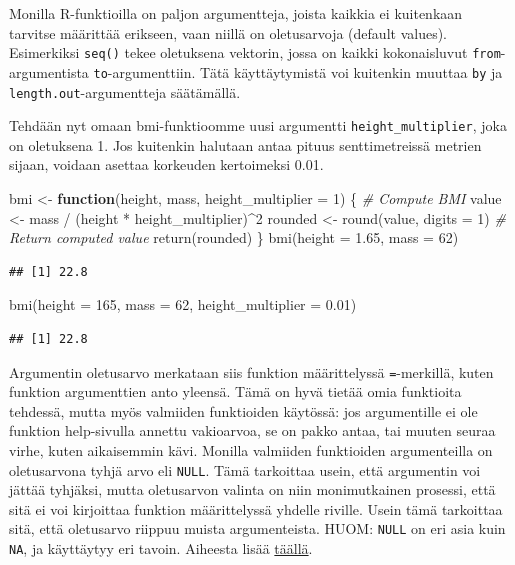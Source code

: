 \documentclass[
]{book}
\newenvironment{Shaded}{\begin{snugshade}}{\end{snugshade}}
\newcommand{\AttributeTok}[1]{\textcolor[rgb]{0.77,0.63,0.00}{#1}}
\newcommand{\CommentTok}[1]{\textcolor[rgb]{0.56,0.35,0.01}{\textit{#1}}}
\newcommand{\ControlFlowTok}[1]{\textcolor[rgb]{0.13,0.29,0.53}{\textbf{#1}}}
\newcommand{\DecValTok}[1]{\textcolor[rgb]{0.00,0.00,0.81}{#1}}
\newcommand{\FloatTok}[1]{\textcolor[rgb]{0.00,0.00,0.81}{#1}}
\newcommand{\FunctionTok}[1]{\textcolor[rgb]{0.00,0.00,0.00}{#1}}
\newcommand{\NormalTok}[1]{#1}
\newcommand{\OtherTok}[1]{\textcolor[rgb]{0.56,0.35,0.01}{#1}}
\newcommand{\SpecialCharTok}[1]{\textcolor[rgb]{0.00,0.00,0.00}{#1}}
\begin{document}
Monilla R-funktioilla on paljon argumentteja, joista kaikkia ei kuitenkaan tarvitse määrittää erikseen, vaan niillä on oletusarvoja (default values). Esimerkiksi \texttt{seq()} tekee oletuksena vektorin, jossa on kaikki kokonaisluvut \texttt{from}-argumentista \texttt{to}-argumenttiin. Tätä käyttäytymistä voi kuitenkin muuttaa \texttt{by} ja \texttt{length.out}-argumentteja säätämällä.

Tehdään nyt omaan bmi-funktioomme uusi argumentti \texttt{height\_multiplier}, joka on oletuksena 1. Jos kuitenkin halutaan antaa pituus senttimetreissä metrien sijaan, voidaan asettaa korkeuden kertoimeksi 0.01.

\begin{Shaded}
\begin{Highlighting}[]
\NormalTok{bmi }\OtherTok{\textless{}{-}} \ControlFlowTok{function}\NormalTok{(height, mass, }\AttributeTok{height\_multiplier =} \DecValTok{1}\NormalTok{) \{}
  \CommentTok{\# Compute BMI}
\NormalTok{  value }\OtherTok{\textless{}{-}}\NormalTok{ mass }\SpecialCharTok{/}\NormalTok{ (height }\SpecialCharTok{*}\NormalTok{ height\_multiplier)}\SpecialCharTok{\^{}}\DecValTok{2}
\NormalTok{  rounded }\OtherTok{\textless{}{-}} \FunctionTok{round}\NormalTok{(value, }\AttributeTok{digits =} \DecValTok{1}\NormalTok{)}
  \CommentTok{\# Return computed value}
  \FunctionTok{return}\NormalTok{(rounded)}
\NormalTok{\}}
\FunctionTok{bmi}\NormalTok{(}\AttributeTok{height =} \FloatTok{1.65}\NormalTok{, }\AttributeTok{mass =} \DecValTok{62}\NormalTok{)}
\end{Highlighting}
\end{Shaded}

\begin{verbatim}
## [1] 22.8
\end{verbatim}

\begin{Shaded}
\begin{Highlighting}[]
\FunctionTok{bmi}\NormalTok{(}\AttributeTok{height =} \DecValTok{165}\NormalTok{, }\AttributeTok{mass =} \DecValTok{62}\NormalTok{, }\AttributeTok{height\_multiplier =} \FloatTok{0.01}\NormalTok{)}
\end{Highlighting}
\end{Shaded}

\begin{verbatim}
## [1] 22.8
\end{verbatim}

Argumentin oletusarvo merkataan siis funktion määrittelyssä \texttt{=}-merkillä, kuten funktion argumenttien anto yleensä. Tämä on hyvä tietää omia funktioita tehdessä, mutta myös valmiiden funktioiden käytössä: jos argumentille ei ole funktion help-sivulla annettu vakioarvoa, se on pakko antaa, tai muuten seuraa virhe, kuten aikaisemmin kävi. Monilla valmiiden funktioiden argumenteilla on oletusarvona tyhjä arvo eli \texttt{NULL}. Tämä tarkoittaa usein, että argumentin voi jättää tyhjäksi, mutta oletusarvon valinta on niin monimutkainen prosessi, että sitä ei voi kirjoittaa funktion määrittelyssä yhdelle riville. Usein tämä tarkoittaa sitä, että oletusarvo riippuu muista argumenteista. HUOM: \texttt{NULL} on eri asia kuin \texttt{NA}, ja käyttäytyy eri tavoin. Aiheesta lisää \href{https://www.r-bloggers.com/r-na-vs-null/}{täällä}.
\end{document}
